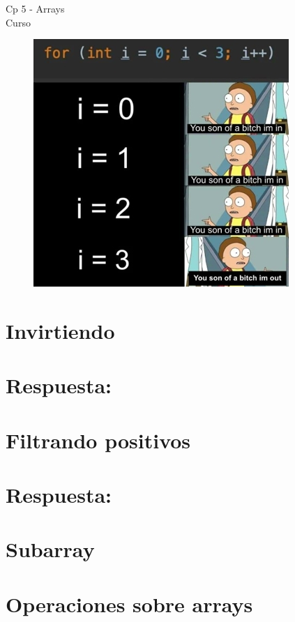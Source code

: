\begin{center}
    \begin{large}
    Cp 5 - Arrays\\
    Curso \academicyear\\
    \end{large}
    \begin{figure}[h]
    	\centering
    	\includegraphics[width=0.5\linewidth]{cp4/loops.jpg}
    \end{figure}
\end{center}

\section{Invirtiendo}

\ifshowanswers
\section*{Respuesta:}

\fi

\section{Filtrando positivos}

\ifshowanswers
\section*{Respuesta:}

\fi

\section{Subarray}


\section{Operaciones sobre arrays}

\ifshowanswers
